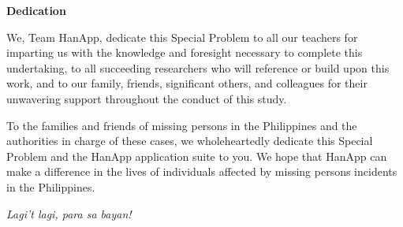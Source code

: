 \begin{center}
	\textbf{Dedication}
\end{center}

\doublespacing

We, Team HanApp, dedicate this Special Problem to all our teachers for imparting us with the knowledge and foresight necessary to complete this undertaking, to all succeeding researchers who will reference or build upon this work, and to our family, friends, significant others, and colleagues for their unwavering support throughout the conduct of this study.

To the families and friends of missing persons in the Philippines and the authorities in charge of these cases, we wholeheartedly dedicate this Special Problem and the HanApp application suite to you. We hope that HanApp can make a difference in the lives of individuals affected by missing persons incidents in the Philippines.

\textit{Lagi't lagi, para sa bayan!}
